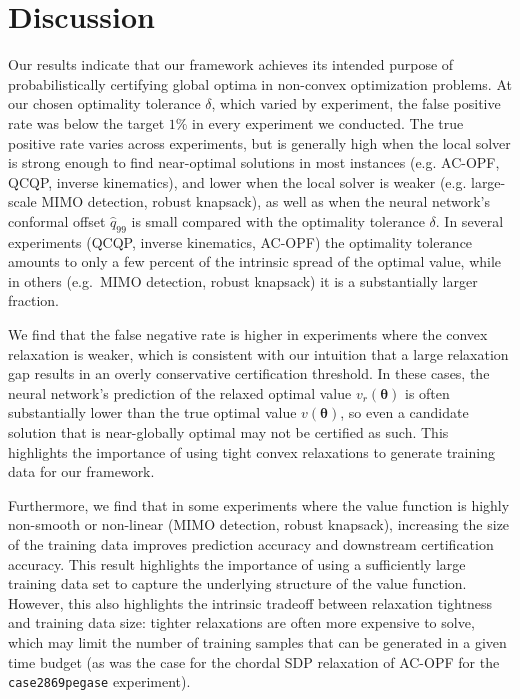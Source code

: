 \documentclass[10pt]{article} %
\theoremstyle{plain}
\theoremstyle{definition}
\theoremstyle{remark}
\begin{document}
\section{Discussion} \label{sec:discussion}

Our results indicate that our framework achieves its intended purpose of probabilistically certifying global optima in non-convex optimization problems.
At our chosen optimality tolerance $\delta$, which varied by experiment, the false positive rate was below the target $1\%$ in every experiment we conducted. The true positive rate varies across experiments, but is generally high when the local solver is strong enough to find near-optimal solutions in most instances (e.g. AC-OPF, QCQP, inverse kinematics), and lower when the local solver is weaker (e.g. large-scale MIMO detection, robust knapsack), as well as when the neural network's conformal offset $\hat{q}_{99}$ is small compared with the optimality tolerance $\delta$. In several experiments (QCQP, inverse kinematics, AC-OPF) the optimality tolerance amounts to only a few percent of the intrinsic spread of the optimal value, while in others (e.g.\ MIMO detection, robust knapsack) it is a substantially larger fraction.

We find that the false negative rate is higher in experiments where the convex relaxation is weaker, which is consistent with our intuition that a large relaxation gap results in an overly conservative certification threshold. In these cases, the neural network's prediction of the relaxed optimal value $v_r(\bm\theta)$ is often substantially lower than the true optimal value $v(\bm\theta)$, so even a candidate solution that is near-globally optimal may not be certified as such. This highlights the importance of using tight convex relaxations to generate training data for our framework.

Furthermore, we find that in some experiments where the value function is highly non-smooth or non-linear (MIMO detection, robust knapsack), increasing the size of the training data improves prediction accuracy and downstream certification accuracy. This result highlights the importance of using a sufficiently large training data set to capture the underlying structure of the value function. However, this also highlights the intrinsic tradeoff between relaxation tightness and training data size: tighter relaxations are often more expensive to solve, which may limit the number of training samples that can be generated in a given time budget (as was the case for the chordal SDP relaxation of AC-OPF for the \texttt{case2869pegase} experiment).
\end{document}
